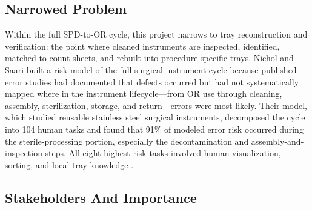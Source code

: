 \documentclass[10pt,a4paper]{article}
\begin{document}
\subsection{Narrowed Problem}
\label{sec:narrowed-problem}

Within the full SPD-to-OR cycle, this project narrows to tray reconstruction
and verification: the point where cleaned instruments are inspected,
identified, matched to count sheets, and rebuilt into procedure-specific trays.
Nichol and Saari built a risk model of the full surgical instrument cycle
because published error studies had documented that defects occurred but had not
systematically mapped where in the instrument lifecycle---from OR use through
cleaning, assembly, sterilization, storage, and return---errors were most
likely. Their model, which studied reusable stainless steel surgical
instruments, decomposed the cycle into 104 human tasks and found that 91\% of
modeled error risk occurred during the sterile-processing portion, especially
the decontamination and assembly-and-inspection steps. All eight highest-risk
tasks involved human visualization, sorting, and local tray knowledge
\cite{nichol-and-saari-risk-modeling-2023}.
\subsection{Stakeholders And Importance}
\label{sec:stakeholders-and-importance}
\end{document}
